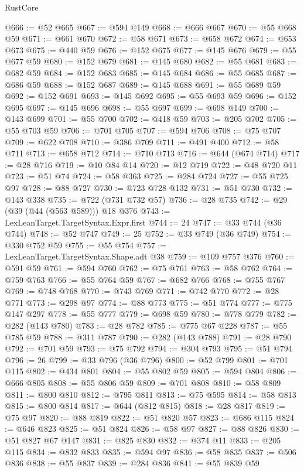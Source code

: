 \begin{lexlean}{RustCore}
\begin{coremodule}
@666 := @52 @665
@667 := @594 @149
@668 := @666 @667
@670 := @55 @668 @59
@671 := @661 @670
@672 := @58 @671
@673 := @658 @672
@674 := @653 @673
@675 := @440 @59
@676 := @152 @675
@677 := @145 @676
@679 := @55 @677 @59
@680 := @152 @679
@681 := @145 @680
@682 := @55 @681
@683 := @682 @59
@684 := @152 @683
@685 := @145 @684
@686 := @55 @685
@687 := @686 @59
@688 := @152 @687
@689 := @145 @688
@691 := @55 @689 @59
@692 := @152 @691
@693 := @145 @692
@695 := @55 @693 @59
@696 := @152 @695
@697 := @145 @696
@698 := @55 @697
@699 := @698 @149
@700 := @143 @699
@701 := @55 @700
@702 := @418 @59
@703 := @205 @702
@705 := @55 @703 @59
@706 := @701 @705
@707 := @594 @706
@708 := @75 @707
@709 := @622 @708
@710 := @386 @709
@711 := @491 @400
@712 := @58 @711
@713 := @658 @712
@714 := @710 @713
@716 := @644 (@674 @714)
@717 := @28 @716
@719 := @10 @84 @14
@720 := @12 @719
@722 := @48 @720 @11
@723 := @51 @74
@724 := @58 @363
@725 := @284 @724
@727 := @55 @725 @97
@728 := @88 @727
@730 := @723 @728 @132
@731 := @51 @730
@732 := @143 @338
@735 := @722 (@731 @732 @57)
@736 := @28 @735
@742 := @29 (@39 (@44 (@563 @589))) @18 @376
@743 := LexLeanTarget.TargetSyntax.Expr.first
@744 := 24
@747 := @33 @744 (@36 @744)
@748 := @52 @747
@749 := 25
@752 := @33 @749 (@36 @749)
@754 := @330 @752 @59
@755 := @55 @754
@757 := LexLeanTarget.TargetSyntax.Shape.adt @38
@759 := @109 @757 @376
@760 := @591 @59
@761 := @594 @760
@762 := @75 @761
@763 := @58 @762
@764 := @759 @763
@766 := @55 @764 @59
@767 := @682 @766
@768 := @755 @767
@769 := @748 @768
@770 := @743 @769
@771 := @742 @770
@772 := @28 @771
@773 := @298 @97
@774 := @88 @773
@775 := @51 @774
@777 := @775 @147 @297
@778 := @55 @777
@779 := @698 @59
@780 := @778 @779
@782 := @282 (@143 @780)
@783 := @28 @782
@785 := @775 @67 @228
@787 := @55 @785 @59
@788 := @311 @787
@790 := @282 (@143 @788)
@791 := @28 @790
@792 := @701 @59
@793 := @75 @792
@794 := @304 @793
@795 := @51 @794
@796 := 26
@799 := @33 @796 (@36 @796)
@800 := @52 @799
@801 := @701 @115
@802 := @434 @801
@804 := @55 @802 @59
@805 := @594 @804
@806 := @666 @805
@808 := @55 @806 @59
@809 := @701 @808
@810 := @58 @809
@811 := @800 @810
@812 := @795 @811
@813 := @75 @595
@814 := @58 @813
@815 := @800 @814
@817 := @644 (@812 @815)
@818 := @28 @817
@819 := @75 @97
@820 := @88 @819
@822 := @51 @820 @57
@823 := @686 @115
@824 := @646 @823
@825 := @51 @824
@826 := @58 @97
@827 := @88 @826
@830 := @51 @827 @67 @147
@831 := @825 @830
@832 := @374 @11
@833 := @205 @115
@834 := @832 @833
@835 := @594 @97
@836 := @58 @835
@837 := @506 @836
@838 := @55 @837
@839 := @284 @836
@841 := @55 @839 @59

\end{coremodule}
\end{lexlean}
